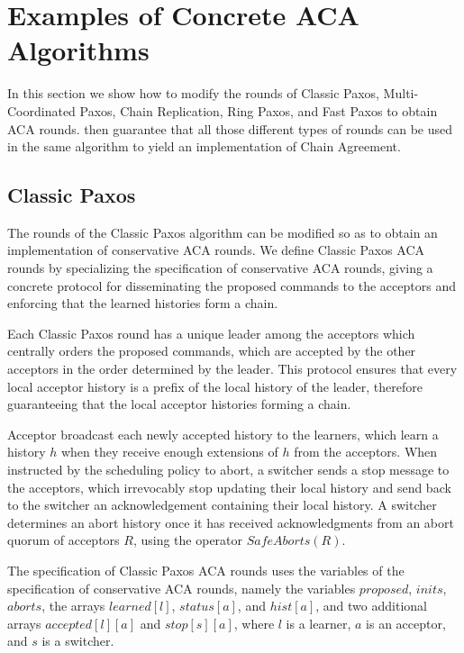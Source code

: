 \section{Examples of Concrete ACA Algorithms}
\label{sec:examples}

In this section we show how to modify the rounds of Classic Paxos,
Multi-Coordinated Paxos, Chain Replication, Ring Paxos, and Fast Paxos to obtain
ACA rounds.  then guarantee that all those different types of
rounds can be used in the same algorithm to yield an implementation of Chain
Agreement.

\subsection{Classic Paxos}

The rounds of the Classic Paxos algorithm can be modified so as to
obtain an implementation of conservative ACA rounds.  We define
Classic Paxos ACA rounds by specializing the specification of
conservative ACA rounds, giving a concrete protocol for disseminating
the proposed commands to the acceptors and enforcing that the learned
histories form a chain.

Each Classic Paxos round has a unique leader among the acceptors which
centrally orders the proposed commands, which are accepted by the
other acceptors in the order determined by the leader.  This protocol
ensures that every local acceptor history is a prefix of the local
history of the leader, therefore guaranteeing that the local acceptor histories
forming a chain.

Acceptor broadcast each newly accepted history to the learners, which
learn a history $h$ when they receive enough extensions of $h$ from the
acceptors.  When instructed by the scheduling policy to abort, a
switcher sends a stop message to the acceptors, which irrevocably stop
updating their local history and send back to the switcher an
acknowledgement containing their local history. A switcher
determines an abort history once it has received acknowledgments from
an abort quorum of acceptors $R$, using the operator $SafeAborts\left(
R \right)$.

The specification of Classic Paxos ACA rounds uses the variables of
the specification of conservative ACA rounds, namely the variables
$proposed$, $inits$, $aborts$, the arrays $learned\left[ l \right]$,
$status\left[ a \right]$, and $hist\left[ a \right]$, and two
additional arrays $accepted\left[ l \right]\left[ a \right]$ and
$stop\left[ s \right]\left[ a \right]$, where $l$ is a learner, $a$ is
an acceptor, and $s$ is a switcher.

